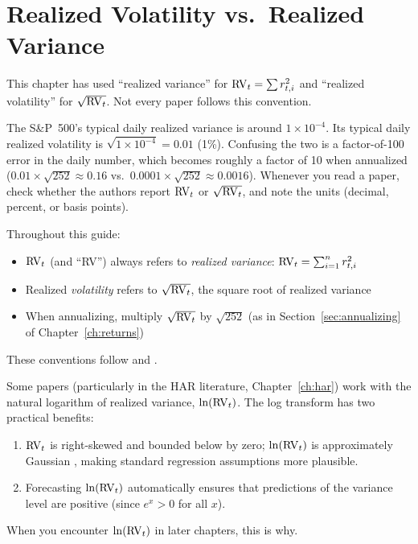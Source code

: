 \section{Realized Volatility vs.\ Realized Variance}
\label{sec:rv-vs-rvol}

This chapter has used ``realized variance'' for $\operatorname{RV}_t = \sum r^2_{t,i}$ and ``realized volatility'' for $\sqrt{\operatorname{RV}_t}$.
Not every paper follows this convention.

\begin{warning}
The S\&P~500's typical daily realized variance is around $1 \times 10^{-4}$.
Its typical daily realized volatility is $\sqrt{1 \times 10^{-4}} = 0.01$ (1\%).
Confusing the two is a factor-of-100 error in the daily number, which becomes roughly a factor of 10 when annualized ($0.01 \times \sqrt{252} \approx 0.16$ vs.\ $0.0001 \times \sqrt{252} \approx 0.0016$).
Whenever you read a paper, check whether the authors report $\operatorname{RV}_t$ or $\sqrt{\operatorname{RV}_t}$, and note the units (decimal, percent, or basis points).
\end{warning}

\begin{definition}
Throughout this guide:
\begin{itemize}[nosep]
  \item $\operatorname{RV}_t$ (and ``RV'') always refers to \emph{realized variance}: $\operatorname{RV}_t = \sum_{i=1}^{n} r^2_{t,i}$
  \item Realized \emph{volatility} refers to $\sqrt{\operatorname{RV}_t}$, the square root of realized variance
  \item When annualizing, multiply $\sqrt{\operatorname{RV}_t}$ by $\sqrt{252}$ (as in Section~\ref{sec:annualizing} of Chapter~\ref{ch:returns})
\end{itemize}
These conventions follow \citet{ABDL2003} and \citet{BNS2002}.
\end{definition}

Some papers (particularly in the HAR literature, Chapter~\ref{ch:har}) work with the natural logarithm of realized variance, $\ln(\operatorname{RV}_t)$.
The log transform has two practical benefits:
\begin{enumerate}[nosep]
  \item $\operatorname{RV}_t$ is right-skewed and bounded below by zero; $\ln(\operatorname{RV}_t)$ is approximately Gaussian \citep{ABDL2001, ABDL2003}, making standard regression assumptions more plausible.
  \item Forecasting $\ln(\operatorname{RV}_t)$ automatically ensures that predictions of the variance level are positive (since $e^x > 0$ for all $x$).
\end{enumerate}
When you encounter $\ln(\operatorname{RV}_t)$ in later chapters, this is why.

